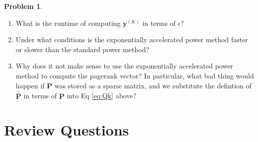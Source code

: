 \documentclass[10pt]{exam}
\theoremstyle{definition}
\newtheorem{problem}{Problem}
\newcommand{\p}{\mathbf P}
\newcommand{\pb}{\bar {\p}}
\newcommand{\pbb}{\bar {\pb}}
\newcommand{\y}{\mathbf y}
\begin{document}
\begin{problem}
\begin{enumerate}

            \vspace{3.5in}
        \item
            What is the runtime of computing $\y^{(K)}$ in terms of $\epsilon$?
            \vspace{4.5in}

        \newpage
        \item
            Under what conditions is the exponentially accelerated power method faster or slower than the standard power method?
            \vspace{4in}


        \item
            Why does it not make sense to use the exponentially accelerated power method to compute the pagerank vector?
            In particular, what bad thing would happen if $\p$ was stored as a sparse matrix, and we substitute the defintion of $\pbb$ in terms of $\p$ into Eq \ref{eq:Qk} above?
            \vspace{4in}
%
    \end{enumerate}
\end{problem}

\newpage
\section{Review Questions}
\end{document}
